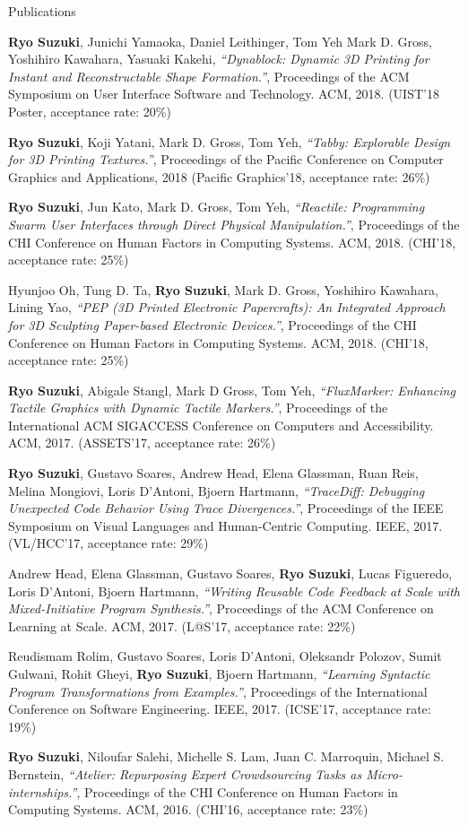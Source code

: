 \documentclass{resume} %
\begin{document}
\begin{rSection}{Publications}

{\bf Ryo Suzuki}, Junichi Yamaoka, Daniel Leithinger, Tom Yeh Mark D. Gross, Yoshihiro Kawahara, Yasuaki Kakehi,
{\it ``Dynablock: Dynamic 3D Printing for Instant and Reconstructable Shape Formation.''},
Proceedings of the ACM Symposium on User Interface Software and Technology. ACM, 2018.
(UIST'18 Poster, acceptance rate: 20\%)

{\bf Ryo Suzuki}, Koji Yatani, Mark D. Gross, Tom Yeh,
{\it ``Tabby: Explorable Design for 3D Printing Textures.''},
Proceedings of the Pacific Conference on Computer Graphics and Applications, 2018
(Pacific Graphics'18, acceptance rate: 26\%)

{\bf Ryo Suzuki}, Jun Kato, Mark D. Gross, Tom Yeh,
{\it ``Reactile: Programming Swarm User Interfaces through Direct Physical Manipulation.''},
Proceedings of the CHI Conference on Human Factors in Computing Systems. ACM, 2018. 
(CHI'18, acceptance rate: 25\%)

Hyunjoo Oh, Tung D. Ta, {\bf Ryo Suzuki}, Mark D. Gross, Yoshihiro Kawahara, Lining Yao,
{\it ``PEP (3D Printed Electronic Papercrafts): An Integrated Approach for 3D Sculpting Paper-based Electronic Devices.''},
Proceedings of the CHI Conference on Human Factors in Computing Systems. ACM, 2018. 
(CHI'18, acceptance rate: 25\%)

{\bf Ryo Suzuki}, Abigale Stangl, Mark D Gross, Tom Yeh,
{\it ``FluxMarker: Enhancing Tactile Graphics with Dynamic Tactile Markers.''}, 
Proceedings of the International ACM SIGACCESS Conference on Computers and Accessibility. ACM, 2017. 
(ASSETS'17, acceptance rate: 26\%)

{\bf Ryo Suzuki}, Gustavo Soares, Andrew Head, Elena Glassman, Ruan Reis, Melina Mongiovi, Loris D'Antoni, Bjoern Hartmann,
{\it ``TraceDiff: Debugging Unexpected Code Behavior Using Trace Divergences.''},
Proceedings of the IEEE Symposium on Visual Languages and Human-Centric Computing. IEEE, 2017. 
(VL/HCC'17, acceptance rate: 29\%)

Andrew Head, Elena Glassman, Gustavo Soares, {\bf Ryo Suzuki}, Lucas Figueredo, Loris D'Antoni, Bjoern Hartmann, 
{\it ``Writing Reusable Code Feedback at Scale with Mixed-Initiative Program Synthesis.''}, 
Proceedings of the ACM Conference on Learning at Scale. ACM, 2017. 
(L@S'17, acceptance rate: 22\%)

Reudismam Rolim, Gustavo Soares, Loris D'Antoni, Oleksandr Polozov, Sumit Gulwani, Rohit Gheyi, {\bf Ryo Suzuki}, Bjoern Hartmann, 
{\it ``Learning Syntactic Program Transformations from Examples.''}, 
Proceedings of the International Conference on Software Engineering. IEEE, 2017. 
(ICSE'17, acceptance rate: 19\%)

{\bf Ryo Suzuki}, Niloufar Salehi, Michelle S. Lam,
Juan C. Marroquin, Michael S. Bernstein,
{\it ``Atelier: Repurposing Expert Crowdsourcing Tasks as Micro-internships.''}, 
Proceedings of the CHI Conference on Human Factors in Computing Systems. ACM, 2016. 
(CHI'16, acceptance rate: 23\%)

\end{rSection}
\end{document}
